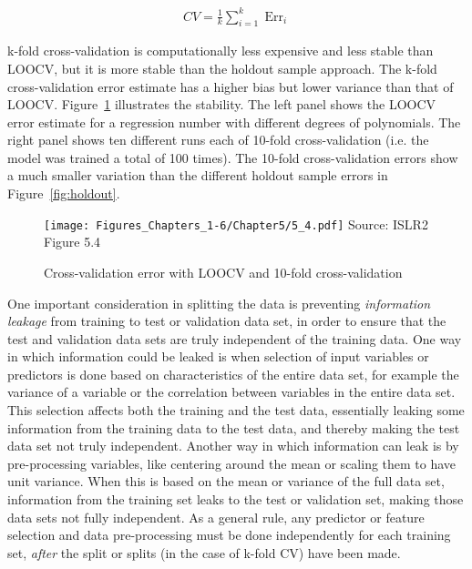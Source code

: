 \begin{align*}
CV = \frac{1}{k} \sum\nolimits_{i=1}^k \operatorname{Err}_i
\end{align*}

k-fold cross-validation is computationally less expensive and less stable than LOOCV, but it is more stable than the holdout sample approach. The k-fold cross-validation error estimate has a higher bias but lower variance than that of LOOCV. Figure~\ref{fig:kfold} illustrates the stability. The left panel shows the LOOCV error estimate for a regression number with different degrees of polynomials. The right panel shows ten different runs each of 10-fold cross-validation (i.e. the model was trained a total of 100 times). The 10-fold cross-validation errors show a much smaller variation than the different holdout sample errors in Figure~\ref{fig:holdout}.

\begin{figure}
\centering

\texttt{[image: Figures\_Chapters\_1-6/Chapter5/5\_4.pdf]}
\scriptsize Source: ISLR2 Figure 5.4
\caption{Cross-validation error with LOOCV and 10-fold cross-validation}
\label{fig:kfold}
\end{figure}

One important consideration in splitting the data is preventing \emph{information leakage} from training to test or validation data set, in order to ensure that the test and validation data sets are truly independent of the training data. One way in which information could be leaked is when selection of input variables or predictors is done based on characteristics of the entire data set, for example the variance of a variable or the correlation between variables in the entire data set. This selection affects both the training and the test data, essentially leaking some information from the training data to the test data, and thereby making the test data set not truly independent. Another way in which information can leak is by pre-processing variables, like centering around the mean or scaling them to have unit variance. When this is based on the mean or variance of the full data set, information from the training set leaks to the test or validation set, making those data sets not fully independent. As a general rule, any predictor or feature selection and data pre-processing must be done independently for each training set, \emph{after} the split or splits (in the case of k-fold CV) have been made. 

